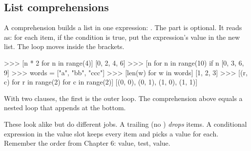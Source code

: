 \subsection{List comprehensions}

A comprehension builds a list in one expression: .
The  part is optional. It reads as: for each item, if the condition is true, put the expression's
value in the new list. The loop moves inside the brackets.

\begin{center}
\end{center}

\begin{pycode}
>>> [n * 2 for n in range(4)]
[0, 2, 4, 6]
>>> [n for n in range(10) if n %
[0, 3, 6, 9]
>>> words = ["a", "bb", "ccc"]
>>> [len(w) for w in words]
[1, 2, 3]
>>> [(r, c) for r in range(2) for c in range(2)]
[(0, 0), (0, 1), (1, 0), (1, 1)]
\end{pycode}

With two  clauses, the first is the outer loop. The comprehension above equals a nested loop that
appends  at the bottom.

\begin{trap}
These look alike but do different jobs. A trailing  (no ) \emph{drops} items. A
conditional expression in the value slot keeps every item and picks a value for each. Remember the order
from Chapter 6: value,  test,  value.
\end{trap}

